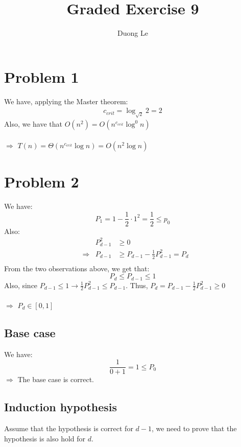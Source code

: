 \documentclass{article}
\title{Graded Exercise 9}
\author{Duong Le}
\date{}
\begin{document}
\maketitle

\section*{Problem 1}
We have, applying the Master theorem:
\[
\begin{aligned}
c_{crit} = \log_{\sqrt{2}}{2} = 2
\end{aligned}
\]
Also, we have that $O(n^2) = O(n^{c_{crit}}\log^0{n})$ \\\\
$\Rightarrow$ $T(n) = \Theta(n^{c_{crit}}\log{n}) = O(n^{2}\log{n})$

\pagebreak
\section*{Problem 2}
We have:
\[
P_1 = 1 - \frac{1}{2} \cdot 1^2 = \frac{1}{2}  \leq p_0
\]
Also:
\[
\begin{aligned}
&                  & P_{d-1}^2 &\geq 0 \\
&\Rightarrow& P_{d-1}     &\geq P_{d-1} - \frac{1}{2} P_{d-1}^2 = P_{d}\\
\end{aligned}
\]
From the two observations above, we get that:
\[
P_{d} \leq P_{d-1} \leq 1
\]
Also, since $P_{d-1} \leq 1 \rightarrow \frac{1}{2}P_{d-1}^2 \leq P_{d-1}$. Thus, $P_d = P_{d-1} - \frac{1}{2}P_{d-1}^2 \geq 0$ \\\\
$\Rightarrow$ $P_d \in [0, 1]$
\subsection*{Base case}
We have: 
\[
\frac{1}{0 + 1} = 1 \leq P_0
\]
$\Rightarrow$ The base case is correct. 
\subsection*{Induction hypothesis}
Assume that the hypothesis is correct for $d-1$, we need to prove that the hypothesis is also hold for $d$.
\end{document}
